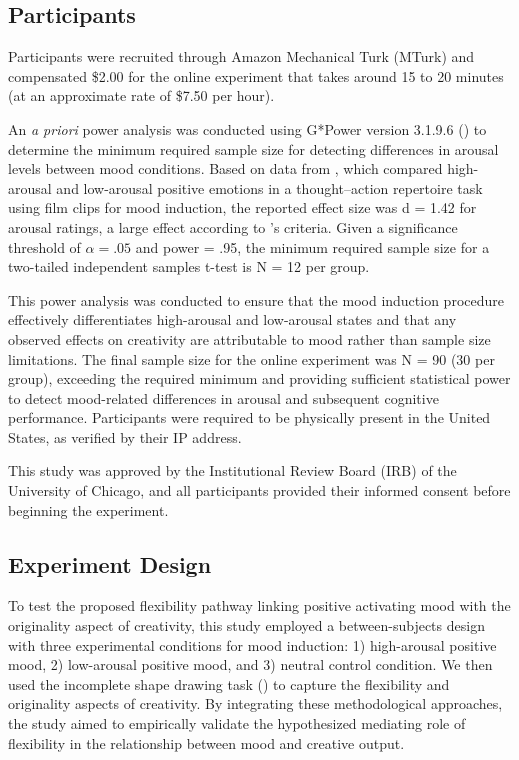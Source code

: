 \documentclass[../MA_Thesis.tex]{subfiles}
\begin{document}
\subsection*{Participants}
Participants were recruited through Amazon Mechanical Turk (MTurk) and compensated \$2.00 for the online experiment that takes around 15 to 20 minutes (at an approximate rate of \$7.50 per hour). 

An \textit{a priori} power analysis was conducted using G*Power version 3.1.9.6 (\cite{faul_gpower_2007}) to determine the minimum required sample size for detecting differences in arousal levels between mood conditions. Based on data from \textcite{sugawara_effect_2021}, which compared high-arousal and low-arousal positive emotions in a thought–action repertoire task using film clips for mood induction, the reported effect size was d = 1.42 for arousal ratings, a large effect according to \textcite{cohen_power_1992}'s criteria. Given a significance threshold of $\alpha = .05$ and power = .95, the minimum required sample size for a two-tailed independent samples t-test is N = 12 per group. 

This power analysis was conducted to ensure that the mood induction procedure effectively differentiates high-arousal and low-arousal states and that any observed effects on creativity are attributable to mood rather than sample size limitations. The final sample size for the online experiment was N = 90 (30 per group), exceeding the required minimum and providing sufficient statistical power to detect mood-related differences in arousal and subsequent cognitive performance. Participants were required to be physically present in the United States, as verified by their IP address.

This study was approved by the Institutional Review Board (IRB) of the University of Chicago, and all participants provided their informed consent before beginning the experiment.

\subsection*{Experiment Design}
To test the proposed flexibility pathway linking positive activating mood with the originality aspect of creativity, this study employed a between-subjects design with three experimental conditions for mood induction: 1) high-arousal positive mood, 2) low-arousal positive mood, and 3) neutral control condition. We then used the incomplete shape drawing task (\cite{barbot_dynamics_2018}) to capture the flexibility and originality aspects of creativity. By integrating these methodological approaches, the study aimed to empirically validate the hypothesized mediating role of flexibility in the relationship between mood and creative output.
\end{document}
